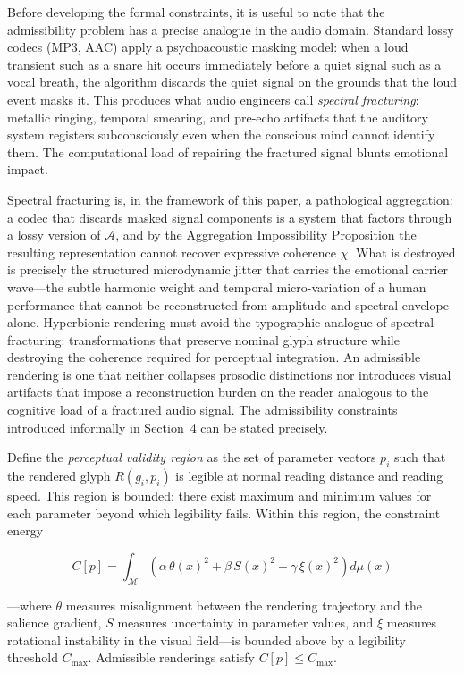 \documentclass[12pt, a4paper]{article}
\begin{document}
Before developing the formal constraints, it is useful to note that the admissibility problem has a precise analogue in the audio domain. Standard lossy codecs (MP3, AAC) apply a psychoacoustic masking model: when a loud transient such as a snare hit occurs immediately before a quiet signal such as a vocal breath, the algorithm discards the quiet signal on the grounds that the loud event masks it. This produces what audio engineers call \emph{spectral fracturing}: metallic ringing, temporal smearing, and pre-echo artifacts that the auditory system registers subconsciously even when the conscious mind cannot identify them. The computational load of repairing the fractured signal blunts emotional impact.

Spectral fracturing is, in the framework of this paper, a pathological aggregation: a codec that discards masked signal components is a system that factors through a lossy version of $\mathcal{A}$, and by the Aggregation Impossibility Proposition the resulting representation cannot recover expressive coherence $\chi$. What is destroyed is precisely the structured microdynamic jitter that carries the emotional carrier wave---the subtle harmonic weight and temporal micro-variation of a human performance that cannot be reconstructed from amplitude and spectral envelope alone. Hyperbionic rendering must avoid the typographic analogue of spectral fracturing: transformations that preserve nominal glyph structure while destroying the coherence required for perceptual integration. An admissible rendering is one that neither collapses prosodic distinctions nor introduces visual artifacts that impose a reconstruction burden on the reader analogous to the cognitive load of a fractured audio signal. The admissibility constraints introduced informally in Section~4 can be stated precisely.

Define the \emph{perceptual validity region} as the set of parameter vectors $p_i$ such that the rendered glyph $R(g_i, p_i)$ is legible at normal reading distance and reading speed. This region is bounded: there exist maximum and minimum values for each parameter beyond which legibility fails. Within this region, the constraint energy

\begin{equation}
C[p] = \int_{\mathcal{M}} \left(\alpha\, \theta(x)^2 + \beta\, S(x)^2 + \gamma\, \xi(x)^2\right) d\mu(x)
\label{eq:Cp}
\end{equation}

---where $\theta$ measures misalignment between the rendering trajectory and the salience gradient, $S$ measures uncertainty in parameter values, and $\xi$ measures rotational instability in the visual field---is bounded above by a legibility threshold $C_{\max}$. Admissible renderings satisfy $C[p] \leq C_{\max}$.
\end{document}
